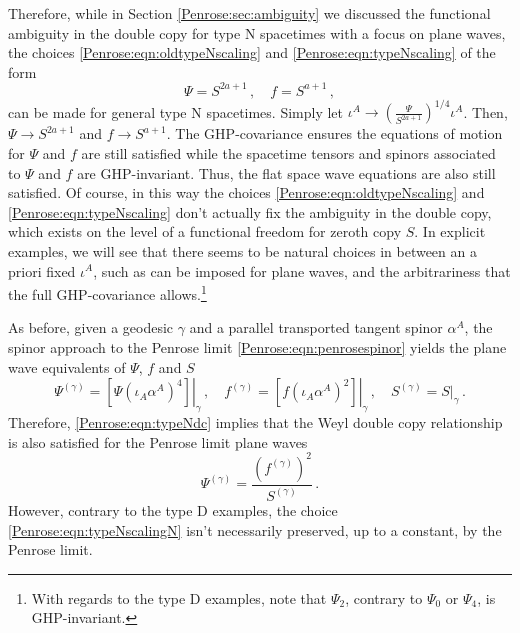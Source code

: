 Therefore, while in Section \ref{Penrose:sec:ambiguity} we discussed the functional ambiguity in the double copy for type N spacetimes with a focus on plane waves, the choices \eqref{Penrose:eqn:oldtypeNscaling} and \eqref{Penrose:eqn:typeNscaling} of the form
\begin{equation}\label{Penrose:eqn:typeNscalingN}
\Psi = S^{2a+1} \, , \quad f = S^{a+1} \, , 
\end{equation}
can be made for general type N spacetimes. Simply let $\iota^A \to \left(\frac{\Psi}{S^{2a+1}}\right)^{1/4} \iota^A$.
Then, $\Psi \to S^{2a+1}$ and $f \to S^{a+1}$. The GHP-covariance ensures the equations of motion for $\Psi$ and
$f$ are still satisfied while the spacetime tensors and spinors associated to $\Psi$ and $f$ are GHP-invariant.
Thus, the flat space wave equations are also still satisfied. Of course, in this way the choices
\eqref{Penrose:eqn:oldtypeNscaling} and \eqref{Penrose:eqn:typeNscaling} don't actually fix the ambiguity in the double copy, which
exists on the level of a functional freedom for zeroth copy $S$. In explicit examples, we will see that there seems
to be natural choices in between an a priori fixed $\iota^A$, such as can be imposed for plane waves, and the
arbitrariness that the full GHP-covariance allows.\footnote{With regards to the type D examples, note that
$\Psi_2$, contrary to $\Psi_0$ or $\Psi_4$, is GHP-invariant.}

As before, given a geodesic $\gamma$ and a parallel transported tangent spinor $\alpha^A$,  the spinor approach to the Penrose limit \eqref{Penrose:eqn:penrosespinor} yields the plane wave equivalents of $\Psi$, $f$ and $S$
\begin{equation}\label{Penrose:eqn:gammatypeN}
\Psi^{(\gamma)} =\left. \left\lbrack \Psi \left(\iota_A \alpha^A\right)^4\right\rbrack  \right|_{\gamma}  \, , \quad f^{(\gamma)} = \left. \left\lbrack  f  \left(\iota_A \alpha^A\right)^2 \right\rbrack \right|_{\gamma}\, , \quad S^{(\gamma)} = S|_{\gamma} \, .
\end{equation}
Therefore, \eqref{Penrose:eqn:typeNdc} implies that the Weyl double copy relationship is also satisfied for the Penrose limit plane waves
\begin{equation}\label{Penrose:eqn:typeNdcpenrose}
\Psi^{(\gamma)} = \frac{\left(f^{(\gamma)}\right)^2}{S^{(\gamma)}} \, .
\end{equation}
However, contrary to the type D examples, the choice \eqref{Penrose:eqn:typeNscalingN} isn't necessarily preserved, up to a constant, by the Penrose limit. 

